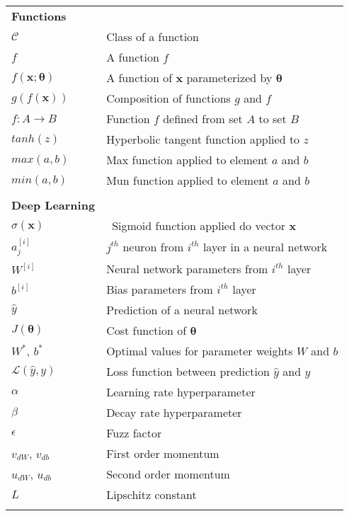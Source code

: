 \begin{longtable}{ll}
\\

{\bf Functions} \\
$\mathcal{C}$ & Class of a function \\
$f$ & A function $f$ \\
$f(\boldsymbol{x}; \boldsymbol{\theta})$ & A function of $\boldsymbol{x}$ parameterized by $\boldsymbol{\theta}$ \\
$g(f(\boldsymbol{x}))$ & Composition of functions $g$ and $f$ \\
$f : A \rightarrow B$ & Function $f$ defined from set $A$  to set $B$ \\
$tanh(z)$ & Hyperbolic tangent function applied to $z$ \\
$max(a,b)$ & Max function applied to element $a$ and $b$ \\
$min(a,b)$ & Mun function applied to element $a$ and $b$ \\

\\

{\bf Deep Learning} \\
$\sigma(\boldsymbol{x})$ &\ Sigmoid function applied do vector
 $\boldsymbol{x}$ \\
 $a^{[i]}_{j}$ & $j^{th}$ neuron from $i^{th}$ layer in a neural network \\
 $W^{[i]}$ & Neural network parameters from $i^{th}$ layer \\
 $b^{[i]}$ & Bias parameters from $i^{th}$ layer \\
 $\hat{y}$ & Prediction of a neural network \\
 $J(\boldsymbol{\theta})$ & Cost function of $\boldsymbol{\theta}$ \\
  $W^{*}$, $b^{*}$ & Optimal values for parameter weights $W$ and $b$ \\
 $\mathcal{L}(\hat{y}, y)$ & Loss function between prediction $\hat{y}$ and $y$ \\
 $\alpha$ & Learning rate hyperparameter \\
 $\beta$ & Decay rate hyperparameter \\
 $\epsilon$ & Fuzz factor \\
 $v_{dW}$, $v_{db}$ & First order momentum \\
 $u_{dW}$, $u_{db}$ & Second order momentum \\
 $L$ & Lipschitz constant \\
 
 \\
 

\end{longtable}
